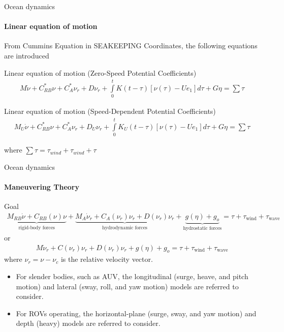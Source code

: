 \begin{frame}{Ocean dynamics}
	\framesubtitle{Linear equation of motion}
	From Cummins Equation in SEAKEEPING Coordinates, the following equations are introduced
	\begin{block}{Linear equation of motion (Zero-Speed Potential Coefficients)}
		\begin{align}
			M\dot{\nu} + C_{RB}^*\nu + C_A^*\nu_r + D\nu_r + \int\limits_0^tK(t-\tau)[\nu(\tau) - Ue_1]d\tau + G\eta = \sum\tau
		\end{align}
	\end{block}
	\begin{block}{Linear equation of motion (Speed-Dependent Potential Coefficients)}
		\begin{align}
			M_U\dot{\nu} + C_{RB}^*\nu + C_A^*\nu_r + D_U\nu_r + \int\limits_0^tK_U(t-\tau)[\nu(\tau) - Ue_1]d\tau + G\eta = \sum\tau
		\end{align}
	\end{block}
	where $\sum\tau = \tau_{wind} + \tau_{wind} + \tau$
\end{frame}




\begin{frame}{Ocean dynamics}
	\framesubtitle{Maneuvering Theory}
	\begin{block}{Goal}
		\begin{align}
			\underbrace{{M_{RB} \dot{\nu} + C_{RB}(\nu) \nu}}_{\text{rigid-body forces}} + 
			\underbrace{{M_A \dot{\nu}_r + C_A(\nu_r) \nu_r + D(\nu_r) \nu_r}}_{\text{hydrodynamic forces}}
			+\underbrace{{g(\eta) + g_o}}_{\text{hydrostatic forces}}
			= \tau + \tau_{\text{wind}} + \tau_{\text{wave}}
		\end{align}
		or
		\begin{align}
			M \dot{\nu}_r + C(\nu_r) \nu_r + D(\nu_r) \nu_r + g(\eta) + g_o = \tau + \tau_{\text{wind}} + \tau_{\text{wave}}
		\end{align}
		where $\nu_r = \nu - \nu_c$ is the relative velocity vector.
	\end{block}
	\begin{itemize}
		\item For slender bodies, such as AUV, the longitudinal (surge, heave, and pitch motion) and lateral (sway, roll, and yaw motion) models are referred to consider.
		\item For ROVs operating, the horizontal-plane (surge, sway, and yaw motion) and depth (heavy) models are referred to consider.
	\end{itemize}
\end{frame}




